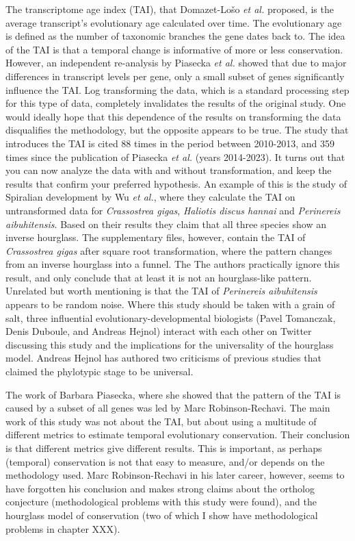 The transcriptome age index (TAI), that Domazet-Lošo \textit{et al.} proposed, is the average transcript's evolutionary age calculated over time. The evolutionary age is defined as the number of taxonomic branches the gene dates back to. The idea of the TAI is that a temporal change is informative of more or less conservation. However, an independent re-analysis by Piasecka \textit{et al.} showed that due to major differences in transcript levels per gene, only a small subset of genes significantly influence the TAI\cite{Piasecka2013}. Log transforming the data, which is a standard processing step for this type of data, completely invalidates the results of the original study. One would ideally hope that this dependence of the results on transforming the data disqualifies the methodology, but the opposite appears to be true. The study that introduces the TAI is cited 88 times in the period between 2010-2013, and 359 times since the publication of Piasecka \textit{et al.} (years 2014-2023). It turns out that you can now analyze the data with and without transformation, and keep the results that confirm your preferred hypothesis. An example of this is the study of Spiralian development by Wu \textit{et al.}\cite{Wu2019}, where they calculate the TAI on untransformed data for \textit{Crassostrea gigas}, \textit{Haliotis discus hannai} and \textit{Perinereis aibuhitensis}. Based on their results they claim that all three species show an inverse hourglass. The supplementary files, however, contain the TAI of \textit{Crassostrea gigas} after square root transformation, where the pattern changes from an inverse hourglass into a funnel. The  The authors practically ignore this result, and only conclude that at least it is not an hourglass-like pattern. Unrelated but worth mentioning is that the TAI of \textit{Perinereis aibuhitensis} appears to be random noise. Where this study should be taken with a grain of salt, three influential evolutionary-developmental biologists (Pavel Tomanczak, Denis Duboule, and Andreas Hejnol) interact with each other on Twitter discussing this study and the implications for the universality of the hourglass model. Andreas Hejnol has authored two criticisms of previous studies that claimed the phylotypic stage to be universal\cite{Dunn2018,hejnol2016}.

The work of Barbara Piasecka, where she showed that the pattern of the TAI is caused by a subset of all genes was led by Marc Robinson-Rechavi. The main work of this study was not about the TAI, but about using a multitude of different metrics to estimate temporal evolutionary conservation. Their conclusion is that different metrics give different results. This is important, as perhaps (temporal) conservation is not that easy to measure, and/or depends on the methodology used. Marc Robinson-Rechavi in his later career, however, seems to have forgotten his conclusion and makes strong claims about the ortholog conjecture\cite{KryuchkovaMostacci2016} (methodological problems with this study were found\cite{Dunn2018}), and the hourglass model of conservation\cite{Liu2020,Liu2021,marletaz2018} (two of which I show have methodological problems in chapter XXX). 


